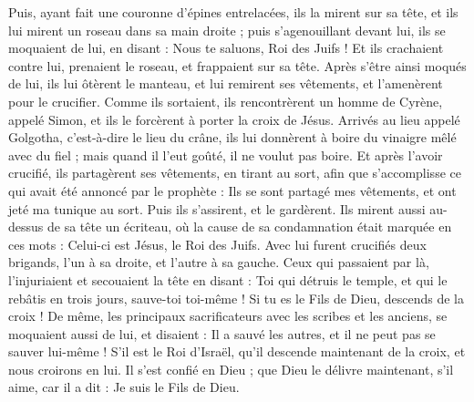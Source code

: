 \begin{multicols}{2}
Puis, ayant fait une couronne d'épines entrelacées, ils la mirent sur sa tête, et ils lui mirent un roseau dans sa main droite ; puis s'agenouillant devant lui, ils se moquaient de lui, en disant : Nous te saluons, Roi des Juifs !
Et ils crachaient contre lui, prenaient le roseau, et frappaient sur sa tête.
Après s'être ainsi moqués de lui, ils lui ôtèrent le manteau, et lui remirent ses vêtements, et l'amenèrent pour le crucifier.
Comme ils sortaient, ils rencontrèrent un homme de Cyrène, appelé Simon, et ils le forcèrent à porter la croix de Jésus.
Arrivés au lieu appelé Golgotha, c'est-à-dire le lieu du crâne,
ils lui donnèrent à boire du vinaigre mêlé avec du fiel{} ; mais quand il l’eut goûté, il ne voulut pas boire.
Et après l'avoir crucifié, ils partagèrent ses vêtements, en tirant au sort, afin que s’accomplisse ce qui avait été annoncé par le prophète : Ils se sont partagé mes vêtements, et ont jeté ma tunique au sort{}.
Puis ils s’assirent, et le gardèrent.
Ils mirent aussi au-dessus de sa tête un écriteau, où la cause de sa condamnation était marquée en ces mots : Celui-ci est Jésus, le Roi des Juifs.
Avec lui furent crucifiés deux brigands, l'un à sa droite, et l'autre à sa gauche.
Ceux qui passaient par là, l’injuriaient et secouaient la tête
en disant : Toi qui détruis le temple, et qui le rebâtis en trois jours, sauve-toi toi-même ! Si tu es le Fils de Dieu, descends de la croix !
De même, les principaux sacrificateurs avec les scribes et les anciens, se moquaient aussi de lui, et disaient :
Il a sauvé les autres, et il ne peut pas se sauver lui-même ! S’il est le Roi d'Israël, qu'il descende maintenant de la croix, et nous croirons en lui.
Il s’est confié en Dieu ; que Dieu le délivre maintenant, s’il aime, car il a dit : Je suis le Fils de Dieu.

\end{multicols}
